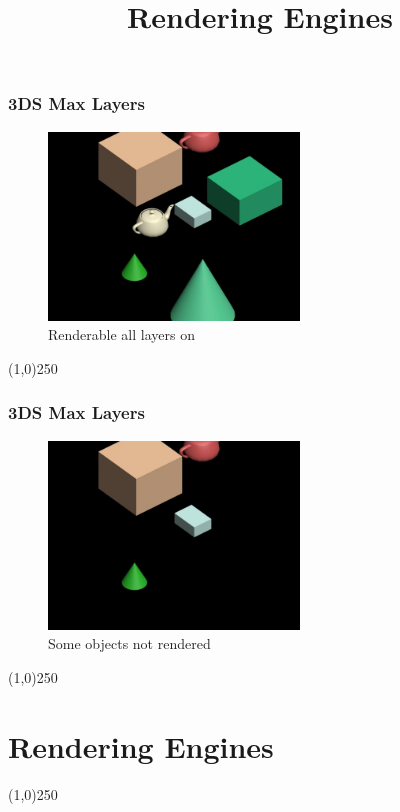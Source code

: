 \begin{frame}
\frametitle{3DS Max Layers}
\begin{figure}
	\centering
	\includegraphics[height=5cm]{3DSUI/RenderableAllOn}
	\caption[Renderable all objects On]{Renderable all layers on}
	\label{fig:allOn}
\end{figure}
\end{frame}
\begin{center}\line(1,0){250}\end{center}

\begin{frame}
\frametitle{3DS Max Layers}
\begin{figure}
	\centering
	\includegraphics[height=5cm]{3DSUI/RenderableSomeOff}
	\caption[Some objects not rendered]{Some objects not rendered}
	\label{fig:allOn}
\end{figure}
\end{frame}
\begin{center}\line(1,0){250}\end{center}



\section{Rendering Engines}
\begin{frame}
\title[Rendering Engines]{Rendering Engines}
\titlepage
\end{frame}\begin{center}\line(1,0){250}\end{center}

